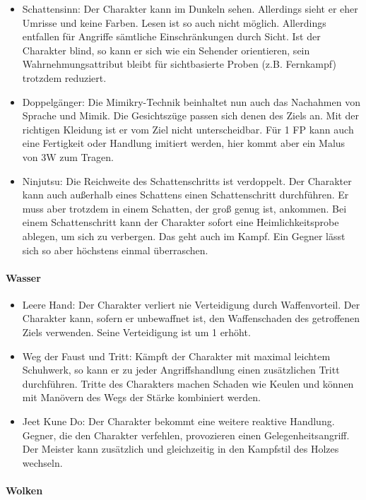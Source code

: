 \documentclass{article}
\begin{document}
\begin{itemize}
\item Schattensinn: Der Charakter kann im Dunkeln sehen. Allerdings sieht er eher Umrisse und keine Farben. Lesen ist so auch nicht möglich. Allerdings entfallen für Angriffe sämtliche Einschränkungen durch Sicht. Ist der Charakter blind, so kann er sich wie ein Sehender orientieren, sein Wahrnehmungsattribut bleibt für sichtbasierte Proben (z.B. Fernkampf) trotzdem reduziert.
\item Doppelgänger: Die Mimikry-Technik beinhaltet nun auch das Nachahmen von Sprache und Mimik. Die Gesichtszüge passen sich denen des Ziels an. Mit der richtigen Kleidung ist er vom Ziel nicht unterscheidbar. Für 1 FP kann auch eine Fertigkeit oder Handlung imitiert werden, hier kommt aber ein Malus von 3W zum Tragen.
\item Ninjutsu: Die Reichweite des Schattenschritts ist verdoppelt. Der Charakter kann auch außerhalb eines Schattens einen Schattenschritt durchführen. Er muss aber trotzdem in einem Schatten, der groß genug ist, ankommen. Bei einem Schattenschritt kann der Charakter sofort eine Heimlichkeitsprobe ablegen, um sich zu verbergen. Das geht auch im Kampf. Ein Gegner lässt sich so aber höchstens einmal überraschen.
\end{itemize}

\paragraph{Wasser}

\begin{itemize}
\item Leere Hand: Der Charakter verliert nie Verteidigung durch Waffenvorteil. Der Charakter kann, sofern er unbewaffnet ist, den Waffenschaden des getroffenen Ziels verwenden. Seine Verteidigung ist um 1 erhöht.
\item Weg der Faust und Tritt: Kämpft der Charakter mit maximal leichtem Schuhwerk, so kann er zu jeder Angriffshandlung einen zusätzlichen Tritt durchführen. Tritte des Charakters machen Schaden wie Keulen und können mit Manövern des Wegs der Stärke kombiniert werden.
\item Jeet Kune Do: Der Charakter bekommt eine weitere reaktive Handlung. Gegner, die den Charakter verfehlen, provozieren einen Gelegenheitsangriff. Der Meister kann zusätzlich und gleichzeitig in den Kampfstil des Holzes wechseln.
\end{itemize}

\paragraph{Wolken}
\end{document}
